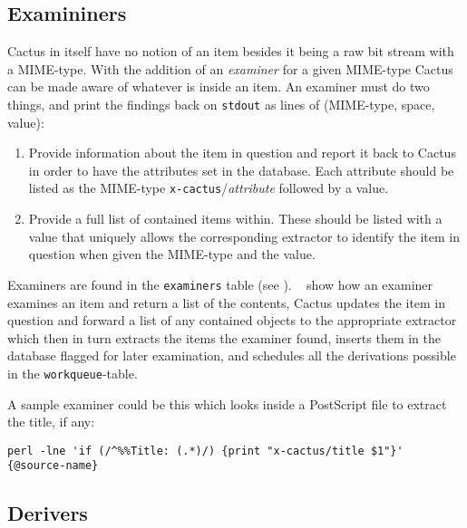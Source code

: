 \subsection{Examininers}

Cactus in itself have no notion of an item besides it being
a raw bit stream with a MIME-type.  With the addition of an
\textit{examiner} for a given MIME-type Cactus can be made
aware of whatever is inside an item.  An examiner must do
two things, and print the findings back on \texttt{stdout}
as lines of (MIME-type, space, value):

\begin{enumerate}
\item Provide information about the item in question and
  report it back to Cactus in order to have the attributes
  set in the database.  Each attribute should be listed as
  the MIME-type \texttt{x-cactus}/\textit{attribute}
  followed by a value.
  
\item Provide a full list of contained items within.  These
  should be listed with a value that uniquely allows the
  corresponding extractor to identify the item in question
  when given the MIME-type and the value.
\end{enumerate}


Examiners are found in the \texttt{examiners} table (see
).  ~ show how an examiner
examines an item and return a list of the contents, Cactus updates the
item in question and forward a list of any contained objects to the
appropriate extractor which then in turn extracts the items the examiner
found, inserts them in the database flagged for later examination, and
schedules all the derivations possible in the
\texttt{workqueue}-table.

A sample examiner could be this which looks inside a PostScript file
to extract the title, if any:

\begin{verbatim}
perl -lne 'if (/^%%Title: (.*)/) {print "x-cactus/title $1"}' {@source-name}
\end{verbatim}

\subsection{Derivers}


